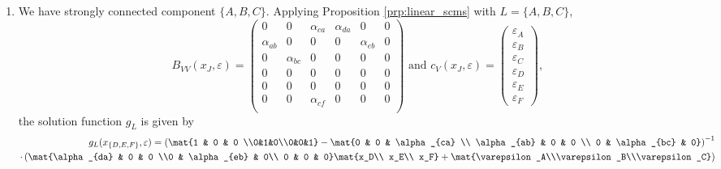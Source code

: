 \begin{enumerate}
	\begin{gradedsolution}
		\begin{enumerate}
			\item {} We have strongly connected component $\{A, B, C\}$. Applying Proposition \ref*{prp:linear_scms} with $L = \{A, B, C\}$,
			\begin{equation*}
				B_{VV}(x_J, \varepsilon) = \begin{pmatrix}
					0           & 0           & \alpha_{ca} & \alpha_{da} & 0           & 0 \\
					\alpha_{ab} & 0           & 0           & 0           & \alpha_{eb} & 0 \\
					0           & \alpha_{bc} & 0           & 0           & 0           & 0 \\
					0           & 0           & 0           & 0           & 0           & 0 \\
					0           & 0           & 0           & 0           & 0           & 0 \\
					0           & 0           & \alpha_{cf} & 0           & 0           & 0 \\
				\end{pmatrix}
				\text{ and }
				c_V(x_J, \varepsilon) = \begin{pmatrix}
					\varepsilon_A \\ \varepsilon_B \\ \varepsilon_C \\ \varepsilon_D \\ \varepsilon_E \\ \varepsilon_F
				\end{pmatrix},
			\end{equation*}
			the solution function $g_L$ is given by
			\begin{align*}
				g_L(x_{\{D, E, F\}}, \varepsilon) = \left(\mat{1 & 0           & 0              \\0&1&0\\0&0&1} - \mat{0 & 0 & \alpha_{ca}  \\
				\alpha_{ab}                                      & 0           & 0              \\
				0                                                & \alpha_{bc} & 0}\right)^{-1} \\
				\cdot \left(\mat{\alpha_{da}                     & 0           & 0              \\0 & \alpha_{eb} & 0\\ 0 & 0 & 0}\mat{x_D\\ x_E\\ x_F} + \mat{\varepsilon_A\\\varepsilon_B\\\varepsilon_C}\right)

\end{align*}
\end{enumerate}
\end{gradedsolution}
\end{enumerate}
